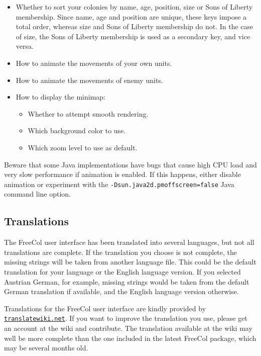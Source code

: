 \documentclass[12pt]{book}
\begin{document}
\begin{itemize}
\item Whether to sort your colonies by name, age, position, size or
Sons of Liberty membership. Since name, age and position are unique,
these keys impose a total order, whereas size and Sons of Liberty
membership do not. In the case of size, the Sons of Liberty membership
is used as a secondary key, and vice versa.

\item How to animate the movements of your own units.

\item How to animate the movements of enemy units.

\item How to display the minimap:

\begin{itemize}
\item Whether to attempt smooth rendering.

\item Which background color to use.

\item Which zoom level to use as default.
\end{itemize}

\end{itemize}

Beware that some Java implementations have bugs that cause high CPU
load and very slow performance if animation is enabled. If this
happens, either disable animation or experiment with the
\texttt{-Dsun.java2d.pmoffscreen=false} Java command line option.


\hypertarget{translations}{\subsection{Translations}}

The FreeCol user interface has been translated into several languages,
but not all translations are complete. If the translation you choose
is not complete, the missing strings will be taken from another
language file. This could be the default translation for your language
or the English language version. If you selected Austrian German, for
example, missing strings would be taken from the default German
translation if available, and the English language version
otherwise.

Translations for the FreeCol user interface are kindly provided by
\href{http://translatewiki.net}{\tt trans\-late\-wiki.net}. If you want to
improve the translation you use, please get an account at the wiki and
contribute. The translation available at the wiki may well be more
complete than the one included in the latest FreeCol package, which
may be several months old.
\end{document}
